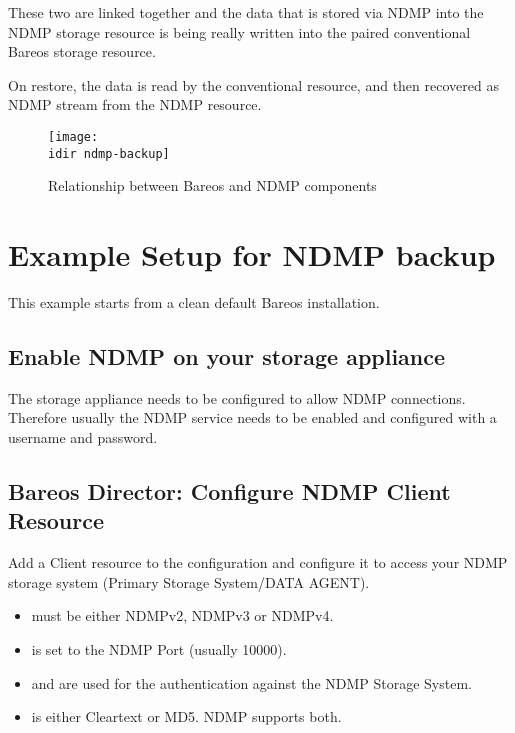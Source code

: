 These two are linked together and the data that is stored via NDMP into the NDMP storage resource is being really written into  the paired conventional Bareos storage resource.

On restore, the data is read by the conventional resource, and then recovered as NDMP stream from the NDMP resource.

\begin{figure}[htbp]
\centering
\texttt{[image: \\idir ndmp-backup]}
\caption{Relationship between Bareos and NDMP components}
\end{figure}%


\section{Example Setup for NDMP backup}

This example starts from a clean default Bareos installation.

\subsection{Enable NDMP on your storage appliance}

The storage appliance needs to be configured to allow NDMP connections. Therefore  usually the
NDMP service needs to be enabled and configured with a username and password.

\subsection{Bareos Director: Configure NDMP Client Resource}

Add a Client resource to the \bareosDir configuration
and configure it to access your NDMP storage system (Primary Storage System/DATA AGENT).

\begin{itemize}
    \item {} must be either NDMPv2, NDMPv3 or NDMPv4.
    \item {} is set to the NDMP Port (usually 10000).
    \item {} and  are used for the authentication against the NDMP Storage System.
    \item {} is either Cleartext or MD5. NDMP supports both.
\end{itemize}

